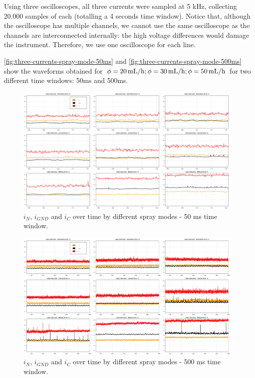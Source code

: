 \documentclass[oneside,12pt]{article}
\begin{document}
Using three oscilloscopes, all three currents were sampled at 5 kHz, collecting 20.000 samples of each
(totalling a 4 seconds time window). Notice that, although the oscilloscope has multiple channels, 
we cannot use the same oscilloscope as the channels are interconnected internally: the high voltage 
differences would damage the instrument. Therefore, we use one oscilloscope for each line. 

\autoref{fig:three-currents-spray-mode-50ms} and \autoref{fig:three-currents-spray-mode-500ms} show the waveforms 
obtained for $\phi = 20 \,\mathrm{mL/h}; \phi = 30 \,\mathrm{mL/h}; \phi = 50 \,\mathrm{mL/h}$ for two different time windows: 50ms 
and 500ms.

\begin{figure}[h!]
    \centering
    \includegraphics[width=1\textwidth,trim=1 1 1 1,clip]{figures/three-currents-spray-mode-50ms.png}
    \caption{$i_N$, $i_{GND}$ and $i_C$ over time by different spray modes - 50 ms time window.}
    \label{fig:three-currents-spray-mode-50ms}
\end{figure}

\begin{figure}[h!]
    \centering
    \includegraphics[width=1\textwidth,trim=1 1 1 1,clip]{figures/three-currents-spray-mode-500ms.png}
    \caption{$i_N$, $i_{GND}$ and $i_C$ over time by different spray modes - 500 ms time window.}
    \label{fig:three-currents-spray-mode-500ms}
\end{figure}
\end{document}
